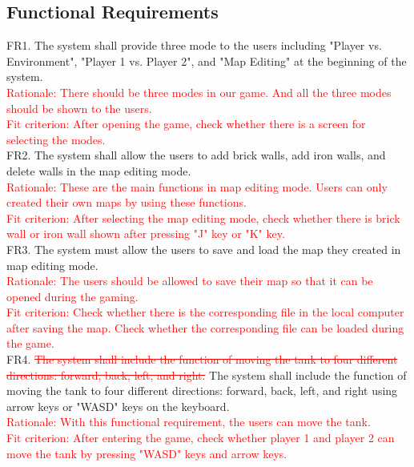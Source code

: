 \documentclass[12pt, titlepage]{article}
\begin{document}
\subsection{Functional Requirements}

  FR1. The system shall provide three mode to the users including "Player vs. Environment", "Player 1 vs. Player 2", and "Map Editing" at the beginning of the system.\\
  \textcolor{red}{Rationale: There should be three modes in our game. And all the three modes should be shown to the users.\\
  Fit criterion: After opening the game, check whether there is a screen for selecting the modes.}\\ \newline
  FR2. The system shall allow the users to add brick walls, add iron walls, and delete walls in the map editing mode.\\
  \textcolor{red}{Rationale: These are the main functions in map editing mode. Users can only created their own maps by using these functions.\\
  Fit criterion: After selecting the map editing mode, check whether there is brick wall or iron wall shown after pressing "J" key or "K" key.}\\ \newline
  FR3. The system must allow the users to save and load the map they created in map editing mode.\\ 
  \textcolor{red}{Rationale: The users should be allowed to save their map so that it can be opened during the gaming.\\
  Fit criterion: Check whether there is the corresponding file in the local computer after saving the map. Check whether the corresponding file can be loaded during the game.}\\ \newline
  FR4. \textcolor{red}{\sout{The system shall include the function of moving the tank to four different directions: forward, back, left, and right.}}
  The system shall include the function of moving the tank to four different directions: forward, back, left, and right using arrow keys or "WASD" keys on the keyboard.\\
  \textcolor{red}{Rationale: With this functional requirement, the users can move the tank.\\
  Fit criterion: After entering the game, check whether player 1 and player 2 can move the tank by pressing "WASD" keys and arrow keys.}\\ \newline
\end{document}
